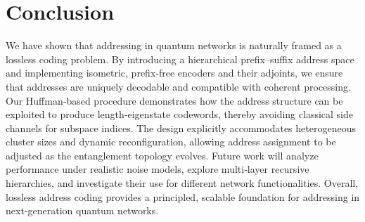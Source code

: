 \documentclass[conference]{IEEEtran}
\begin{document}
    



\section{Conclusion}\label{conclusion}

We have shown that addressing in quantum networks is naturally framed as a lossless coding problem. By introducing a hierarchical prefix–suffix address space and implementing isometric, prefix‑free encoders and their adjoints, we ensure that addresses are uniquely decodable and compatible with coherent processing. Our Huffman‑based procedure demonstrates how the address structure can be exploited to produce length‑eigenstate codewords, thereby avoiding classical side channels for subspace indices. The design explicitly accommodates heterogeneous cluster sizes and dynamic reconfiguration, allowing address assignment to be adjusted as the entanglement topology evolves. Future work will analyze performance under realistic noise models, explore multi‑layer recursive hierarchies, and investigate their use for different network functionalities. Overall, lossless address coding provides a principled, scalable foundation for addressing in next‑generation quantum networks.
\end{document}
